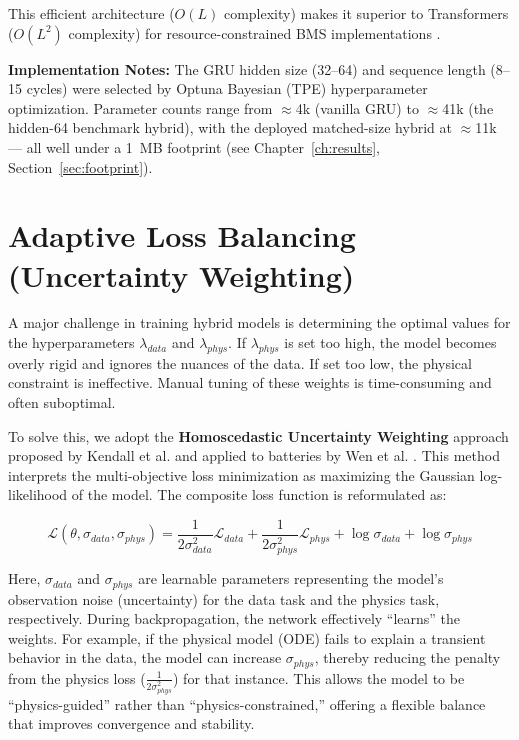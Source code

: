 This efficient architecture ($O(L)$ complexity) makes it superior to Transformers ($O(L^2)$ complexity) for resource-constrained BMS implementations \cite{ref1_general}.

\textbf{Implementation Notes:} The GRU hidden size (32--64) and sequence length (8--15 cycles) were selected by Optuna \cite{akiba_optuna} Bayesian (TPE) hyperparameter optimization. Parameter counts range from $\approx$4k (vanilla GRU) to $\approx$41k (the hidden-64 benchmark hybrid), with the deployed matched-size hybrid at $\approx$11k --- all well under a 1~MB footprint (see Chapter~\ref{ch:results}, Section~\ref{sec:footprint}).

\section{Adaptive Loss Balancing (Uncertainty Weighting)}
\label{sec:uncertainty_weighting}

A major challenge in training hybrid models is determining the optimal values for the hyperparameters $\lambda_{data}$ and $\lambda_{phys}$. If $\lambda_{phys}$ is set too high, the model becomes overly rigid and ignores the nuances of the data. If set too low, the physical constraint is ineffective. Manual tuning of these weights is time-consuming and often suboptimal.

To solve this, we adopt the \textbf{Homoscedastic Uncertainty Weighting} approach proposed by Kendall et al. \cite{kendall_uncertainty} and applied to batteries by Wen et al. \cite{pde_pinn}. This method interprets the multi-objective loss minimization as maximizing the Gaussian log-likelihood of the model. The composite loss function is reformulated as:

\begin{equation}
    \mathcal{L}(\theta, \sigma_{data}, \sigma_{phys}) = \frac{1}{2\sigma_{data}^2} \mathcal{L}_{data} + \frac{1}{2\sigma_{phys}^2} \mathcal{L}_{phys} + \log \sigma_{data} + \log \sigma_{phys}
\end{equation}

Here, $\sigma_{data}$ and $\sigma_{phys}$ are learnable parameters representing the model's observation noise (uncertainty) for the data task and the physics task, respectively. During backpropagation, the network effectively ``learns'' the weights. For example, if the physical model (ODE) fails to explain a transient behavior in the data, the model can increase $\sigma_{phys}$, thereby reducing the penalty from the physics loss ($\frac{1}{2\sigma_{phys}^2}$) for that instance. This allows the model to be ``physics-guided'' rather than ``physics-constrained,'' offering a flexible balance that improves convergence and stability.

